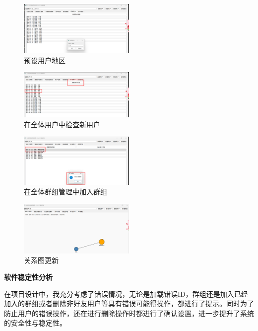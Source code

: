 \documentclass[12pt,a4paper]{article}
\begin{document}
\begin{figure}[H]
    \centering
    \includegraphics[width=0.5\textwidth]{pt2-51.png}
    \caption{预设用户地区}
\end{figure}

\begin{figure}[H]
    \centering
    \includegraphics[width=0.5\textwidth]{pt2-48.png}
    \caption{在全体用户中检查新用户}
\end{figure}

\begin{figure}[H]
    \centering
    \includegraphics[width=0.5\textwidth]{pt2-49.png}
    \caption{在全体群组管理中加入群组}
\end{figure}

\begin{figure}[H]
    \centering
    \includegraphics[width=0.5\textwidth]{pt2-50.png}
    \caption{关系图更新}
\end{figure}

\noindent\textbf{软件稳定性分析}

在项目设计中，我充分考虑了错误情况，无论是加载错误ID，群组还是加入已经加入的群组或者删除非好友用户等具有错误可能得操作，都进行了提示。同时为了防止用户的错误操作，还在进行删除操作时都进行了确认设置，进一步提升了系统的安全性与稳定性。
\end{document}
